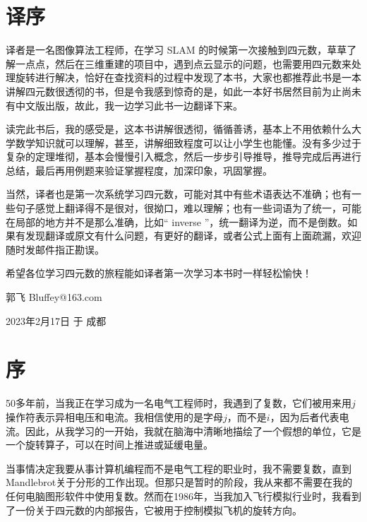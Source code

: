 \section*{译序} 
译者是一名图像算法工程师，在学习 SLAM 的时候第一次接触到四元数，草草了解一点点，然后在三维重建的项目中，遇到点云显示的问题，也需要用四元数来处理旋转进行解决，恰好在查找资料的过程中发现了本书，大家也都推荐此书是一本讲解四元数很透彻的书，但是令我感到惊奇的是，如此一本好书居然目前为止尚未有中文版出版，故此，我一边学习此书一边翻译下来。

读完此书后，我的感受是，这本书讲解很透彻，循循善诱，基本上不用依赖什么大学数学知识就可以理解，甚至，讲解细致程度可以让小学生也能懂。没有多少过于复杂的定理堆彻，基本会慢慢引入概念，然后一步步引导推导，推导完成后再进行总结，最后再用例题来验证掌握程度，加深印象，巩固掌握。

当然，译者也是第一次系统学习四元数，可能对其中有些术语表达不准确；也有一些句子感觉上翻译得不是很对，很拗口，难以理解；也有一些词语为了统一，可能在局部的地方并不是那么准确，比如“ inverse ”，统一翻译为逆，而不是倒数。如果有发现翻译或原文有什么问题，有更好的翻译，或者公式上面有上面疏漏，欢迎随时发邮件指正勘误。

希望各位学习四元数的旅程能如译者第一次学习本书时一样轻松愉快！

\hfill 郭飞  Bluffey@163.com

\hfill 2023年2月17日 于 成都 



\newpage
{}
\section*{序}


50多年前，当我正在学习成为一名电气工程师时，我遇到了复数，它们被用来用$j$操作符表示异相电压和电流。我相信使用的是字母$j$，而不是$ i $，因为后者代表电流。因此，从我学习的一开始，我就在脑海中清晰地描绘了一个假想的单位，它是一个旋转算子，可以在时间上推进或延缓电量。


当事情决定我要从事计算机编程而不是电气工程的职业时，我不需要复数，直到Mandlebrot关于分形的工作出现。但那只是暂时的阶段，我从来都不需要在我的任何电脑图形软件中使用复数。然而在1986年，当我加入飞行模拟行业时，我看到了一份关于四元数的内部报告，它被用于控制模拟飞机的旋转方向。

